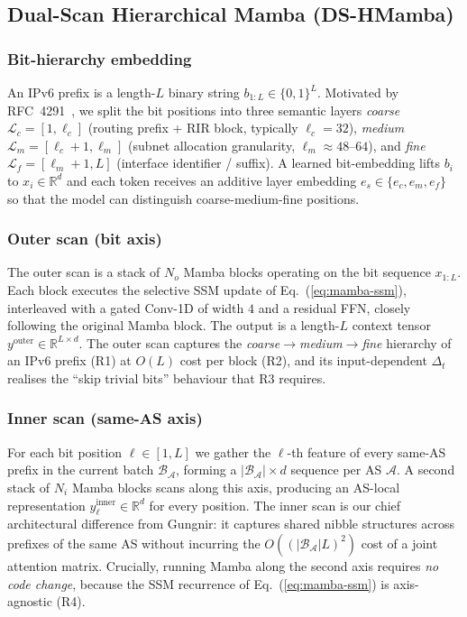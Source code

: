 \documentclass[conference]{IEEEtran}
\begin{document}
\subsection{Dual-Scan Hierarchical Mamba (DS-HMamba)}
\label{sec:design:model}

\subsubsection{Bit-hierarchy embedding}
An IPv6 prefix is a length-$L$ binary string
$b_{1:L}\!\in\!\{0,1\}^{L}$.  Motivated by
RFC~4291~\cite{hinden2006rfc4291}, we split the bit positions
into three semantic layers
\emph{coarse} $\mathcal{L}_c\!=\![1,\ell_c]$
(routing prefix + RIR block, typically $\ell_c\!=\!32$),
\emph{medium} $\mathcal{L}_m\!=\![\ell_c\!+\!1,\ell_m]$
(subnet allocation granularity, $\ell_m\!\approx\!48\text{--}64$),
and \emph{fine} $\mathcal{L}_f\!=\![\ell_m\!+\!1,L]$ (interface
identifier / suffix).  A learned bit-embedding lifts $b_i$ to
$x_i\!\in\!\mathbb{R}^{d}$ and each token receives an additive
layer embedding $e_s\!\in\!\{e_c,e_m,e_f\}$ so that the model
can distinguish coarse-medium-fine positions.

\subsubsection{Outer scan (bit axis)}
The outer scan is a stack of $N_o$ Mamba blocks operating on
the bit sequence $x_{1:L}$.  Each block executes the selective
SSM update of Eq.~(\ref{eq:mamba-ssm}), interleaved with a
gated Conv-1D of width $4$ and a residual FFN, closely
following the original Mamba block.  The output is a length-$L$
context tensor
$y^{\text{outer}}\!\in\!\mathbb{R}^{L\times d}$.  The outer
scan captures the
\emph{coarse$\rightarrow$medium$\rightarrow$fine} hierarchy of
an IPv6 prefix (R1) at $O(L)$ cost per block (R2), and its
input-dependent $\Delta_t$ realises the ``skip trivial bits''
behaviour that R3 requires.

\subsubsection{Inner scan (same-AS axis)}
For each bit position $\ell\!\in\![1,L]$ we gather the
$\ell$-th feature of every same-AS prefix in the current batch
$\mathcal{B}_{\mathcal{A}}$, forming a
$|\mathcal{B}_{\mathcal{A}}|\!\times\!d$ sequence per AS
$\mathcal{A}$.  A second stack of $N_i$ Mamba blocks scans
along this axis, producing an AS-local representation
$y^{\text{inner}}_{\ell}\!\in\!\mathbb{R}^{d}$ for every
position.  The inner scan is our chief architectural difference
from Gungnir: it captures shared nibble structures across
prefixes of the same AS without incurring the
$O((|\mathcal{B}_{\mathcal{A}}|L)^2)$ cost of a joint attention
matrix.  Crucially, running Mamba along the second axis
requires \emph{no code change}, because the SSM recurrence of
Eq.~(\ref{eq:mamba-ssm}) is axis-agnostic (R4).
\end{document}
